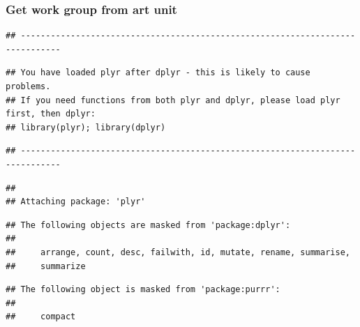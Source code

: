 \documentclass[
]{article}
\newenvironment{Shaded}{\begin{snugshade}}{\end{snugshade}}
\newcommand{\AttributeTok}[1]{\textcolor[rgb]{0.77,0.63,0.00}{#1}}
\newcommand{\CommentTok}[1]{\textcolor[rgb]{0.56,0.35,0.01}{\textit{#1}}}
\newcommand{\DecValTok}[1]{\textcolor[rgb]{0.00,0.00,0.81}{#1}}
\newcommand{\FunctionTok}[1]{\textcolor[rgb]{0.00,0.00,0.00}{#1}}
\newcommand{\NormalTok}[1]{#1}
\newcommand{\OtherTok}[1]{\textcolor[rgb]{0.56,0.35,0.01}{#1}}
\newcommand{\SpecialCharTok}[1]{\textcolor[rgb]{0.00,0.00,0.00}{#1}}
\begin{document}
\hypertarget{get-work-group-from-art-unit}{%
\subsubsection{Get work group from art
unit}\label{get-work-group-from-art-unit}}

\begin{Shaded}
\end{Shaded}

\begin{verbatim}
## ------------------------------------------------------------------------------
\end{verbatim}

\begin{verbatim}
## You have loaded plyr after dplyr - this is likely to cause problems.
## If you need functions from both plyr and dplyr, please load plyr first, then dplyr:
## library(plyr); library(dplyr)
\end{verbatim}

\begin{verbatim}
## ------------------------------------------------------------------------------
\end{verbatim}

\begin{verbatim}
## 
## Attaching package: 'plyr'
\end{verbatim}

\begin{verbatim}
## The following objects are masked from 'package:dplyr':
## 
##     arrange, count, desc, failwith, id, mutate, rename, summarise,
##     summarize
\end{verbatim}

\begin{verbatim}
## The following object is masked from 'package:purrr':
## 
##     compact
\end{verbatim}
\end{document}
